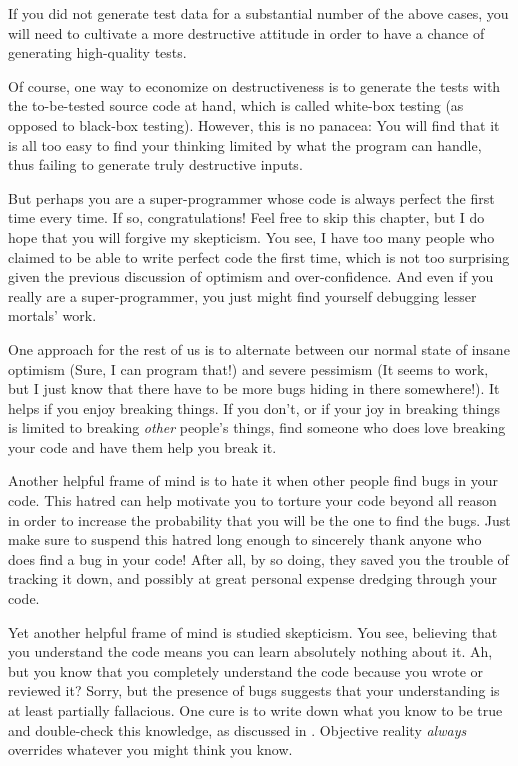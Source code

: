 {	If you did not generate test data for a substantial number of
	the above cases, you will need to cultivate a more destructive
	attitude in order to have a chance of generating high-quality
	tests.

	Of course, one way to economize on destructiveness is to
	generate the tests with the to-be-tested source code at hand,
	which is called white-box testing (as opposed to black-box testing).
	However, this is no panacea:
	You will find that it is all too easy to find your thinking
	limited by what the program can handle, thus failing to generate
	truly destructive inputs.
}\QuickQuizEnd

But perhaps you are a super-programmer whose code is always perfect
the first time every time.
If so, congratulations!
Feel free to skip this chapter, but
I do hope that you will forgive my skepticism.
You see, I have too many people who claimed to be able to write perfect
code the first time, which is not too surprising given the previous
discussion of optimism and over-confidence.
And even if you really are a super-programmer, you just might
find yourself debugging lesser mortals' work.

One approach for the rest of us is to alternate between our normal
state of insane optimism
(Sure, I can program that!\@) and severe pessimism
(It seems to work, but I just know that there have to be more bugs hiding
in there somewhere!).
It helps if you enjoy breaking things.
If you don't, or if your joy in breaking things is limited to breaking
\emph{other} people's things, find someone who does love breaking your
code and have them help you break it.

Another helpful frame of mind is to hate it when other people find bugs in
your code.
This hatred can help motivate you to torture your code beyond all reason
in order to increase the probability that you will be the one to find
the bugs.
Just make sure to suspend this hatred long enough to sincerely thank
anyone who does find a bug in your code!
After all, by so doing, they saved you the trouble of tracking it down,
and possibly at great personal expense dredging through your code.

Yet another helpful frame of mind is studied skepticism.
You see, believing that you understand the code means you can learn
absolutely nothing about it.
Ah, but you know that you completely understand the code because you
wrote or reviewed it?
Sorry, but the presence of bugs suggests that your understanding is at
least partially fallacious.
One cure is to write down what you know to be true and double-check this
knowledge, as discussed in
.
Objective reality \emph{always} overrides whatever you
might think you know.


